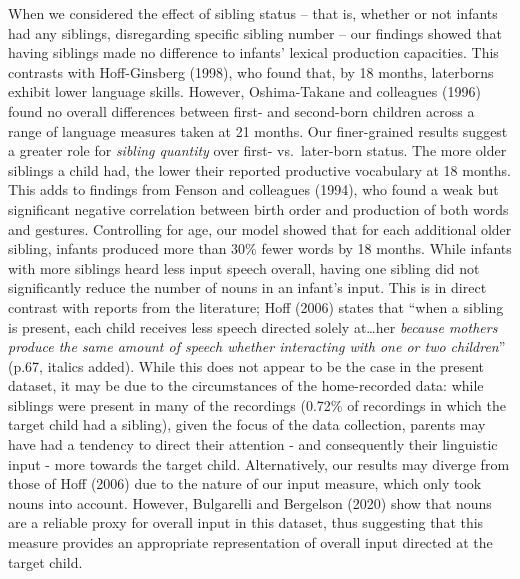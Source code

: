 \documentclass[
  english,
  man,floatsintext]{apa6}
\begin{document}
When we considered the effect of sibling status -- that is, whether or not infants had any siblings, disregarding specific sibling number -- our findings showed that having siblings made no difference to infants' lexical production capacities. This contrasts with Hoff-Ginsberg (1998), who found that, by 18 months, laterborns exhibit lower language skills. However, Oshima-Takane and colleagues (1996) found no overall differences between first- and second-born children across a range of language measures taken at 21 months. Our finer-grained results suggest a greater role for \emph{sibling quantity} over first- vs.~later-born status. The more older siblings a child had, the lower their reported productive vocabulary at 18 months. This adds to findings from Fenson and colleagues (1994), who found a weak but significant negative correlation between birth order and production of both words and gestures. Controlling for age, our model showed that for each additional older sibling, infants produced more than 30\% fewer words by 18 months.
While infants with more siblings heard less input speech overall, having one sibling did not significantly reduce the number of nouns in an infant's input. This is in direct contrast with reports from the literature; Hoff (2006) states that \enquote{when a sibling is present, each child receives less speech directed solely at\ldots her \emph{because mothers produce the same amount of speech whether interacting with one or two children}} (p.67, italics added). While this does not appear to be the case in the present dataset, it may be due to the circumstances of the home-recorded data: while siblings were present in many of the recordings (0.72\% of recordings in which the target child had a sibling), given the focus of the data collection, parents may have had a tendency to direct their attention - and consequently their linguistic input - more towards the target child. Alternatively, our results may diverge from those of Hoff (2006) due to the nature of our input measure, which only took nouns into account. However, Bulgarelli and Bergelson (2020) show that nouns are a reliable proxy for overall input in this dataset, thus suggesting that this measure provides an appropriate representation of overall input directed at the target child.
\end{document}
